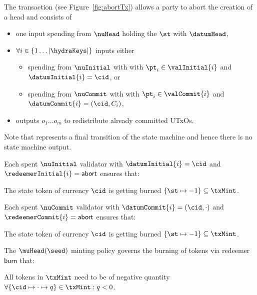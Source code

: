 The \mtxAbort{} transaction (see Figure~\ref{fig:abortTx}) allows a
party to abort the creation of a head and consists of
\begin{itemize}
	\item one input spending from $\nuHead$ holding the $\st$ with $\datumHead$,
	\item $\forall i \in \{1 \dots |\hydraKeys|\}$ inputs either
	      \begin{itemize}
		      \item spending from $\nuInitial$ with with $\pt_{i} \in \valInitial{i}$ and $\datumInitial{i} = \cid$, or
		      \item spending from $\nuCommit$ with with $\pt_{i} \in \valCommit{i}$ and $\datumCommit{i} = (\cid, C_{i})$,
	      \end{itemize}
	\item outputs $o_{1} \dots o_{m}$ to redistribute already committed UTxOs.
\end{itemize}

Note that \mtxAbort{} represents a final transition of the state
machine and hence there is no state machine output.

\noindent Each spent $\nuInitial$ validator with $\datumInitial{i} = \cid$ and $\redeemerInitial{i} = \mathsf{abort}$ ensures that:
\begin{menumerate}
	\item The state token of currency $\cid$ is getting burned $\{\st \mapsto -1\} \subseteq \txMint$.
\end{menumerate}

\noindent Each spent $\nuCommit$ validator with $\datumCommit{i} = (\cid,\cdot)$ and $\redeemerCommit{i} = \mathsf{abort}$ ensures that:
\begin{menumerate}
	\item The state token of currency $\cid$ is getting burned $\{\st \mapsto -1\} \subseteq \txMint$.
\end{menumerate}

\noindent The $\muHead(\seed)$ minting policy governs the burning of tokens via
redeemer $\mathsf{burn}$ that:
\begin{menumerate}
	\item All tokens in $\txMint$ need to be of negative quantity
	$\forall \{\cid \mapsto \cdot \mapsto q\} \in \txMint : q < 0$.
\end{menumerate}

